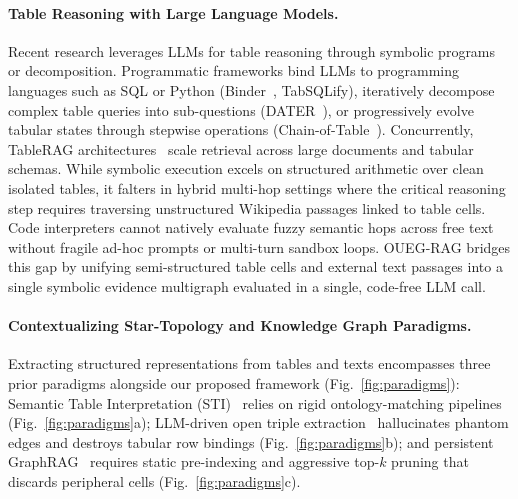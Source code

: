\documentclass[runningheads]{llncs}
\begin{document}
\paragraph{Table Reasoning with Large Language Models.}
Recent research leverages LLMs for table reasoning through symbolic programs or decomposition. Programmatic frameworks bind LLMs to programming languages such as SQL or Python (Binder~\cite{cheng2023binder}, TabSQLify), iteratively decompose complex table queries into sub-questions (DATER~\cite{ye2023dater}), or progressively evolve tabular states through stepwise operations (Chain-of-Table~\cite{wang2024chainoftable}). Concurrently, TableRAG architectures~\cite{chen2024tablerag,yu2025tablerag} scale retrieval across large documents and tabular schemas. While symbolic execution excels on structured arithmetic over clean isolated tables, it falters in hybrid multi-hop settings where the critical reasoning step requires traversing unstructured Wikipedia passages linked to table cells. Code interpreters cannot natively evaluate fuzzy semantic hops across free text without fragile ad-hoc prompts or multi-turn sandbox loops. OUEG-RAG bridges this gap by unifying semi-structured table cells and external text passages into a single symbolic evidence multigraph evaluated in a single, code-free LLM call.

\paragraph{Contextualizing Star-Topology and Knowledge Graph Paradigms.}
Extracting structured representations from tables and texts encompasses three prior paradigms alongside our proposed framework (Fig.~\ref{fig:paradigms}): Semantic Table Interpretation (STI)~\cite{ritze2016matching,deng2020turl} relies on rigid ontology-matching pipelines (Fig.~\ref{fig:paradigms}a); LLM-driven open triple extraction~\cite{edge2024graphrag,pan2024unifying} hallucinates phantom edges and destroys tabular row bindings (Fig.~\ref{fig:paradigms}b); and persistent GraphRAG~\cite{edge2024graphrag,tan2025hydrarag,peng2024graphragsurvey} requires static pre-indexing and aggressive top-$k$ pruning that discards peripheral cells (Fig.~\ref{fig:paradigms}c).
\end{document}
